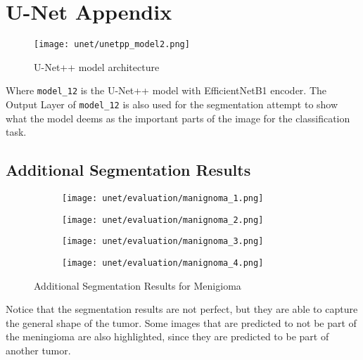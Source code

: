 \section{U-Net Appendix}\label{s:unetAppendix}

\begin{figure}[H]
  \begin{center}
    \texttt{[image: unet/unetpp\_model2.png]}
  \end{center}
  \caption{U-Net++ model architecture}\label{fig:unetpp_model}
\end{figure}

Where \texttt{model\_12} is the U-Net++ model with EfficientNetB1 encoder. The Output Layer of \texttt{model\_12} is also used for the segmentation attempt to show what the model deems as the important parts of the image for the classification task.

\subsection{Additional Segmentation Results}

\begin{figure}[H]
  \centering
  \begin{subfigure}[b]{0.23\textwidth}
    \centering
    \texttt{[image: unet/evaluation/manignoma\_1.png]}
  \end{subfigure}
  \hfill
  \begin{subfigure}[b]{0.23\textwidth}
    \centering
    \texttt{[image: unet/evaluation/manignoma\_2.png]}
  \end{subfigure}
  \hfill
  \begin{subfigure}[b]{0.23\textwidth}
    \centering
    \texttt{[image: unet/evaluation/manignoma\_3.png]}
  \end{subfigure}
  \hfill
  \begin{subfigure}[b]{0.23\textwidth}
    \centering
    \texttt{[image: unet/evaluation/manignoma\_4.png]}
  \end{subfigure}
  \caption{Additional Segmentation Results for Menigioma}
  \label{fig:malignoma_segmentation}
\end{figure}

Notice that the segmentation results are not perfect, but they are able to capture the general shape of the tumor. Some images that are predicted to not be part of the meningioma are also highlighted, since they are predicted to be part of another tumor.


%
